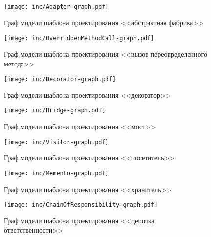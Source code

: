 \begin{figure}[!ht]
\centering
\texttt{[image: inc/Adapter-graph.pdf]}
\caption{Граф модели шаблона проектирования <<абстрактная фабрика>>}
\label{fig:Adapter-graph}
\end{figure}

\begin{figure}[!ht]
\centering
\texttt{[image: inc/OverriddenMethodCall-graph.pdf]}
\caption{Граф модели шаблона проектирования <<вызов переопределенного метода>>}
\label{fig:OverriddenMethodCall-graph}
\end{figure}

\begin{figure}[!ht]
\centering
\texttt{[image: inc/Decorator-graph.pdf]}
\caption{Граф модели шаблона проектирования <<декоратор>>}
\label{fig:Decorator-graph}
\end{figure}

\begin{figure}[!ht]
\centering
\texttt{[image: inc/Bridge-graph.pdf]}
\caption{Граф модели шаблона проектирования <<мост>>}
\label{fig:Bridge-graph}
\end{figure}

\begin{figure}[!ht]
\centering
\texttt{[image: inc/Visitor-graph.pdf]}
\caption{Граф модели шаблона проектирования <<посетитель>>}
\label{fig:Visitor-graph}
\end{figure}

\begin{figure}[!ht]
\centering
\texttt{[image: inc/Memento-graph.pdf]}
\caption{Граф модели шаблона проектирования <<хранитель>>}
\label{fig:Memento-graph}
\end{figure}

\begin{figure}[!ht]
\centering
\texttt{[image: inc/ChainOfResponsibility-graph.pdf]}
\caption{Граф модели шаблона проектирования <<цепочка ответственности>>}
\label{fig:ChainOfResponsibility-graph}
\end{figure}
